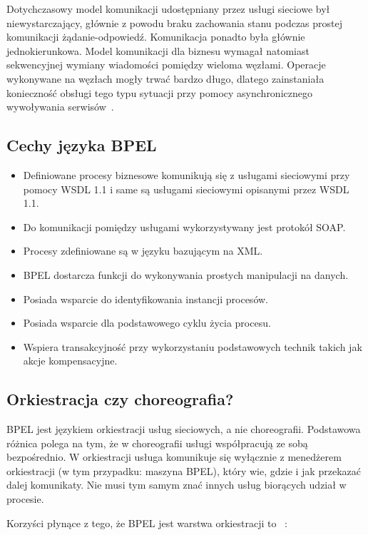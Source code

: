 Dotychczasowy model komunikacji udostępniany przez usługi sieciowe był niewystarczający, głównie z powodu braku zachowania stanu podczas prostej komunikacji żądanie-odpowiedź.  Komunikacja ponadto była głównie jednokierunkowa. Model komunikacji dla biznesu wymagał natomiast sekwencyjnej wymiany wiadomości pomiędzy wieloma węzłami. Operacje wykonywane na węzłach mogły trwać bardzo długo, dlatego zainstaniała konieczność obsługi tego typu sytuacji przy pomocy asynchronicznego wywoływania serwisów~\cite{OASISBPELSpec}.

\subsection{Cechy języka BPEL}
\label{sec:bpelFeatures}

\begin{itemize}
\item Definiowane procesy biznesowe komunikują się z usługami sieciowymi przy pomocy WSDL 1.1 i same są usługami sieciowymi opisanymi przez WSDL 1.1.  
\item Do komunikacji pomiędzy usługami wykorzystywany jest protokół SOAP.
\item Procesy zdefiniowane są w języku bazującym na XML.
\item BPEL dostarcza funkcji do wykonywania prostych manipulacji na danych.
\item Posiada wsparcie do identyfikowania instancji procesów.
\item Posiada wsparcie dla podstawowego cyklu życia procesu.
\item Wspiera transakcyjność przy wykorzystaniu podstawowych technik takich jak akcje kompensacyjne.
\end{itemize}

\subsection{Orkiestracja czy choreografia?}
\label{sec:bpelOrchestration}
BPEL jest językiem orkiestracji usług sieciowych, a nie choreografii. Podstawowa różnica polega na tym, że w choreografii usługi współpracują ze sobą bezpośrednio. W orkiestracji usługa komunikuje się wyłącznie z menedżerem orkiestracji (w tym przypadku: maszyna BPEL), który wie, gdzie i jak przekazać dalej komunikaty. Nie musi tym samym znać innych usług biorących udział w procesie. 

Korzyści płynące z tego, że BPEL jest warstwa orkiestracji to ~\cite{wiao}:

